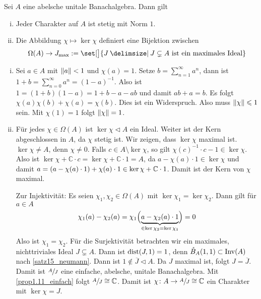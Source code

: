 \begin{satz}[label=satz:1.13]
	Sei $A$ eine abelsche unitale Banachalgebra. Dann gilt
	\begin{enumerate}[(i)]
		\item Jeder Charakter auf $A$ ist stetig mit Norm $1$.
		\item Die Abbildung $\chi \mapsto \ker \chi$ definiert eine Bijektion zwischen 
		\[
			\Omega(A) \to J_{\max} := \set[\big]{J \given J \subsetneq A \text{ ist ein maximales Ideal} }
		\]
	\end{enumerate}
\end{satz}
\begin{beweis}\leavevmode
	\begin{enumerate}[(i)]
		\item Sei $a \in A$ mit $\norm{a}<1$ und $\chi(a)=1$. Setze $b= \sum_{n=1}^{\infty} a^n$, dann ist $1 + b = \sum_{n=0}^{\infty} a^n = (1-a)^{-1}$. Also ist
		$1 = (1+b)(1-a) = 1 + b -a -ab$ und damit $ab+a=b$. Es folgt $\chi(a)\chi(b) + \chi(a)= \chi(b)$. Dies ist ein Widerspruch. Also muss $\norm{\chi}\le 1$ sein. Mit 
		$\chi(1)=1$ folgt $\norm{\chi}=1$.
		\item Für jedes $\chi \in \Omega(A)$ ist $\ker \chi \lhd A$ ein Ideal. Weiter ist der Kern abgeschlossen in $A$, da $\chi$ stetig ist. Wir zeigen, dass $\ker \chi$ maximal 
		ist. $\ker \chi \not= A$, denn $\chi \not= 0$. Falls $c \in A \setminus \ker \chi$, so gilt 
		\(
			\chi(c)^{-1} \cdot c-1 \in \ker \chi
		\).
		Also ist $\ker \chi + \mathbb{C} \cdot c = \ker \chi + \mathbb{C} \cdot 1=A$, da $a- \chi(a) \cdot 1 \in \ker \chi$ und damit 
		$a= \enbrace*{a- \chi(a) \cdot 1}+ \chi(a) \cdot 1 \in \ker \chi + \mathbb{C} \cdot 1$. Damit ist der Kern von $\chi$ maximal.
		
		Zur Injektivität: Es seien $\chi_1, \chi_2 \in \Omega(A)$ mit $\ker \chi_1 = \ker \chi_2$. Dann gilt für $a \in A$
		\begin{align}
			\chi_1(a) - \chi_2(a) = \chi_1 \enbrace[\Big]{\Underbrace{a - \chi_2(a) \cdot 1}{\in \ker \chi_2=\ker \chi_1}} = 0
		\end{align}
		Also ist $\chi_1=\chi_2$. Für die Surjektivität betrachten wir ein maximales, nichttriviales Ideal $J \subsetneq A$. Dann ist $\dist \enbrace*{J,1}=1$, denn 
		$\mathring{B}_A(1,1) \subset \Inv(A)$ nach \autoref{satz15_neumann}. Dann ist $1 \notin \overline{J} \lhd A$. Da $J$ maximal ist, folgt $J=\overline{J}$. Damit ist 
		$\sfrac{A}{J}$ eine einfache, abelsche, unitale Banachalgebra. Mit \autoref{prop1.11_einfach} folgt $\sfrac{A}{J} \cong \mathbb{C}$. Damit ist 
		$\chi \colon A \to \sfrac{A}{J} \cong \mathbb{C}$ ein Charakter mit $\ker \chi= J$. \qedhere
	\end{enumerate}
\end{beweis}

